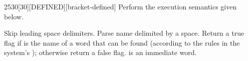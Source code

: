 
\begin{worddef}{2530}[30]{[DEFINED]}[bracket-defined]%
\compile
	Perform the execution semantics given below.

\execute

	Skip leading space delimiters.  Parse name delimited by a space.
	Return a true flag if  is the name of a word that can
	be found (according to the rules in the system's );
	otherwise return a false flag.
	\word{[DEFINED]} is an immediate word.

	\begin{implement} %
		\word{:} \word{[DEFINED]}      \word{;} 
	\end{implement}
\end{worddef}

